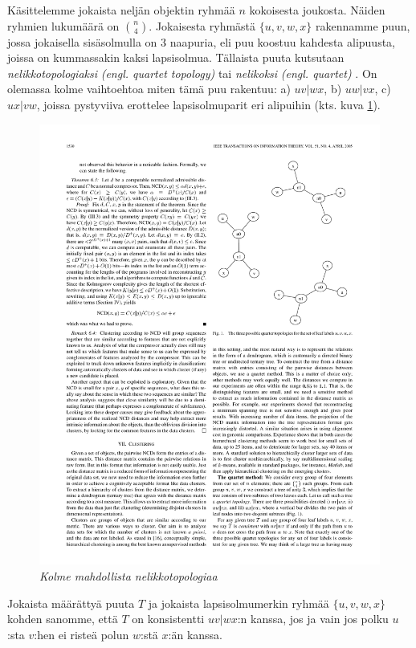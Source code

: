 \documentclass[12pt,finnish]{tktltiki2}
\theoremstyle{definition}
\theoremstyle{remark}
\newcommand{\engl}[1]{\emph{(engl. #1)}}
\begin{document}
    Käsittelemme jokaista neljän objektin ryhmää $n$ kokoisesta joukosta. Näiden ryhmien lukumäärä on $\binom{n}{4}$.
    Jokaisesta ryhmästä $\{u,v,w,x\}$ rakennamme puun, jossa jokaisella sisäsolmulla on 3 naapuria, eli puu koostuu kahdesta alipuusta, joissa on kummassakin kaksi lapsisolmua.
    Tällaista puuta kutsutaan \emph{nelikkotopologiaksi} \engl{quartet topology} \cite{CV05} tai \emph{nelikoksi} \engl{quartet} \cite{10.1109/WDM.2004.1358107}.
    On olemassa kolme vaihtoehtoa miten tämä puu rakentuu: a) $uv|wx$, b) $uw|vx$, c) $ux|vw$, joissa pystyviiva erottelee lapsisolmuparit eri alipuihin (kts. kuva \ref{fig:ternary-tree}).

    \begin{figure}[tb]
      \immediate{}
      \includegraphics{img/ternary-tree}
      \caption{\emph{Kolme mahdollista nelikkotopologiaa}
      \cite{CV05}}
      \label{fig:ternary-tree}
    \end{figure}


    Jokaista määrättyä puuta $T$ ja jokaista lapsisolmumerkin ryhmää $\{u,v,w,x\}$ kohden sanomme, että $T$ on konsistentti $uv|wx$:n kanssa, jos ja vain jos polku $u$:sta $v$:hen ei risteä polun $w$:stä $x$:än kanssa.
\end{document}
